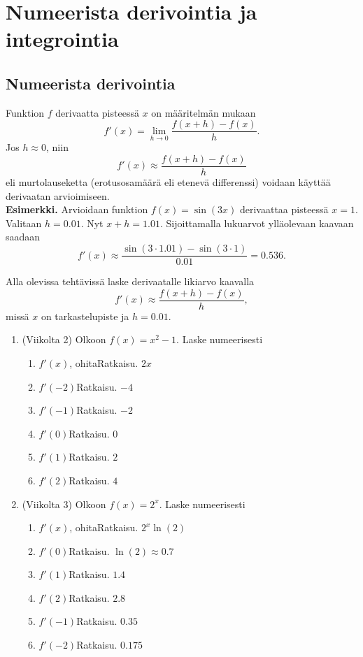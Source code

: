 \documentclass[10pt]{article}
\newcommand{\ratkaisu}[1]{\hfill{\color{blue}\quad\textrm{Ratkaisu. } #1}}
\begin{document}
\section{Numeerista derivointia ja integrointia}
\subsection{Numeerista derivointia}

Funktion $f$ derivaatta pisteessä $x$ on määritelmän mukaan
$$
f'(x)=\lim_{h\to 0}\frac{f(x+h)-f(x)}{h}.
$$
Jos $h\approx 0$, niin
$$
f'(x)\approx \frac{f(x+h)-f(x)}{h}
$$
eli murtolauseketta (erotusosamäärä eli etenevä differenssi) voidaan käyttää derivaatan arvioimiseen.\\

\textbf{Esimerkki.} Arvioidaan funktion $f(x)=\sin(3x)$ derivaattaa pisteessä $x=1$. Valitaan $h=0.01$. Nyt $x+h=1.01$. Sijoittamalla lukuarvot ylläolevaan kaavaan saadaan
$$
f'(x)\approx\frac{\sin(3\cdot 1.01)-\sin(3\cdot 1)}{0.01}
=0.536.
$$

Alla olevissa tehtävissä laske derivaatalle likiarvo kaavalla
$$
f'(x)\approx \frac{f(x+h)-f(x)}{h},
$$
missä $x$ on tarkastelupiste ja $h=0.01$.

\begin{enumerate}
\item (Viikolta 2) Olkoon $f(x)=x^2-1$. Laske numeerisesti
\begin{enumerate}
\item $f'(x)$, ohita\ratkaisu{$2x$}
\item $f'(-2)$\ratkaisu{$-4$}
\item $f'(-1)$\ratkaisu{$-2$}
\item $f'(0)$\ratkaisu{$0$}
\item $f'(1)$\ratkaisu{$2$}
\item $f'(2)$\ratkaisu{$4$}
\end{enumerate}
\item (Viikolta 3) Olkoon $f(x)=2^x$. Laske numeerisesti
\begin{enumerate}
\item $f'(x)$, ohita\ratkaisu{$2^x\ln(2)$}
\item $f'(0)$\ratkaisu{$\ln(2)\approx 0.7$}
\item $f'(1)$\ratkaisu{$1.4$}
\item $f'(2)$\ratkaisu{$2.8$}
\item $f'(-1)$\ratkaisu{$0.35$}
\item $f'(-2)$\ratkaisu{$0.175$}
\end{enumerate}
\end{enumerate}
\end{document}
